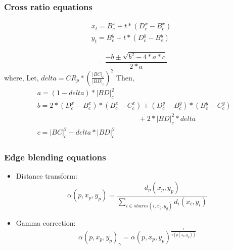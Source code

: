 \documentclass[40pt]{beamer}
\begin{document}
\appendix


\begin{frame}[label=crossrat]
\frametitle{Cross ratio equations}
\begin{equation}
\begin{aligned}
x_t=B_c^x+t*(D_c^x-B_c^x)\\
y_t=B_c^y+t*(D_c^y-B_c^y)
\end{aligned}
\end{equation}

\begin{equation}
[t_1,t_2]=\frac{-b\pm\sqrt{b^{2}-4*a*c}}{2*a} 
\end{equation}
where,\newline
Let,\newline
$delta={CR_p*(\frac{|BC|_c}{|BD|_c})}^2$\newline
Then,
\begin{align*}
&a=(1-delta)*|BD|_c^2 \\
&b=2*{(D_c^x-B_c^x)*(B_c^x-C_c^x)+(D_c^y-B_c^y)*(B_c^y-C_c^y)}\\& \hspace{6cm}+2*|BD|_c^{2}*delta \\
&c=|BC|_c^2-delta*|BD|_c^2
\end{align*}




\end{frame}


\begin{frame}[label=distform]
\frametitle{Edge blending equations}
\begin{itemize}
\item Distance transform:
\begin{equation}
\alpha(p,x_p,y_p)=\frac{d_p(x_p,y_p)}{\sum\nolimits_{i \in shares(i,x_g,y_g)} d_i(x_i,y_i)}
\end{equation}
\item Gamma correction:
\begin{equation}
\alpha(p,x_p,y_p)_\gamma=\alpha(p,x_p,y_p)^{\frac{1}{\gamma(p(x_p,y_p))}}
\end{equation}
\end{itemize}

\end{frame}
\end{document}

